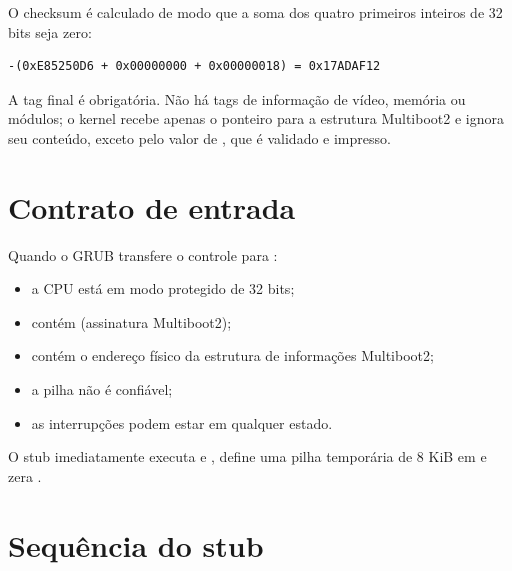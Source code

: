 O checksum \'e calculado de modo que a soma dos quatro primeiros inteiros de
32 bits seja zero:

\begin{verbatim}
-(0xE85250D6 + 0x00000000 + 0x00000018) = 0x17ADAF12
\end{verbatim}

A tag final \'e obrigat\'oria. N\~ao h\'a tags de informa\c{c}\~ao de
v\'ideo, mem\'oria ou m\'odulos; o kernel recebe apenas o ponteiro para a
estrutura Multiboot2 e ignora seu conte\'udo, exceto pelo valor de
, que \'e validado e impresso.

\section{Contrato de entrada}

Quando o GRUB transfere o controle para :

\begin{itemize}
  \item a CPU est\'a em modo protegido de 32 bits;
  \item {} cont\'em  (assinatura Multiboot2);
  \item {} cont\'em o endere\c{c}o f\'isico da estrutura de
        informa\c{c}\~oes Multiboot2;
  \item a pilha n\~ao \'e confi\'avel;
  \item as interrup\c{c}\~oes podem estar em qualquer estado.
\end{itemize}

O stub imediatamente executa  e , define uma pilha
tempor\'aria de 8 KiB em  e zera .

\section{Sequ\^encia do stub}

